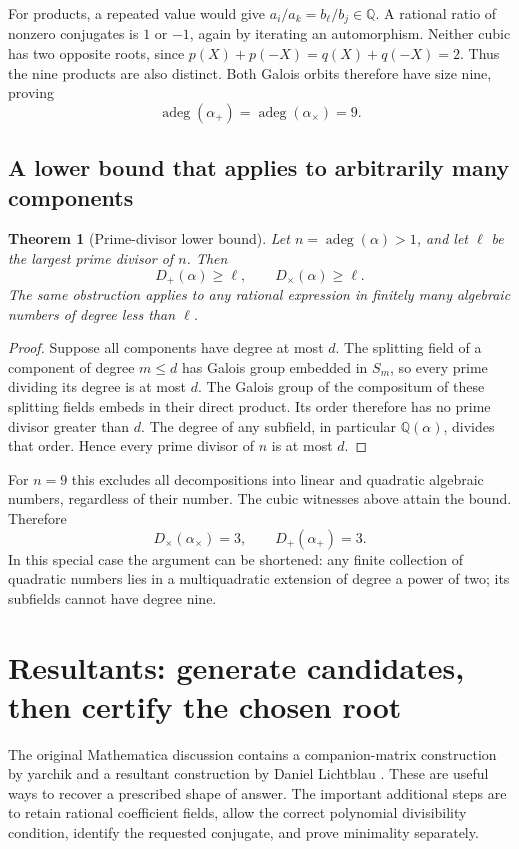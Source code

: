 \documentclass[11pt]{article}
\newcommand{\Q}{\mathbb Q}
\newcommand{\adeg}{\operatorname{adeg}}
\newtheorem{theorem}{Theorem}[section]
\theoremstyle{definition}\newtheorem{definition}[theorem]{Definition}
\theoremstyle{remark}\newtheorem{remark}[theorem]{Remark}
\begin{document}
For products, a repeated value would give $a_i/a_k=b_\ell/b_j\in\Q$.
A rational ratio of nonzero conjugates is $1$ or $-1$, again by iterating an
automorphism. Neither cubic has two opposite roots, since
$p(X)+p(-X)=q(X)+q(-X)=2$. Thus the nine products are also distinct.
Both Galois orbits therefore have size nine, proving
\[
 \adeg(\alpha_+)=\adeg(\alpha_\times)=9.
\]

\subsection{A lower bound that applies to arbitrarily many components}
\begin{theorem}[Prime-divisor lower bound]\label{thm:prime}
Let $n=\adeg(\alpha)>1$, and let $\ell$ be the largest prime divisor of $n$.
Then
\[
 D_+(\alpha)\ge\ell,\qquad D_\times(\alpha)\ge\ell.
\]
The same obstruction applies to any rational expression in finitely many
algebraic numbers of degree less than $\ell$.
\end{theorem}
\begin{proof}
Suppose all components have degree at most $d$. The splitting field of a
component of degree $m\le d$ has Galois group embedded in $S_m$, so every
prime dividing its degree is at most $d$. The Galois group of the compositum
of these splitting fields embeds in their direct product. Its order therefore
has no prime divisor greater than $d$. The degree of any subfield, in particular
$\Q(\alpha)$, divides that order. Hence every prime divisor of $n$ is at most $d$.
\end{proof}
For $n=9$ this excludes all decompositions into linear and quadratic algebraic
numbers, regardless of their number. The cubic witnesses above attain the
bound. Therefore
\[
 \boxed{D_\times(\alpha_\times)=3,\qquad D_+(\alpha_+)=3.}
\]
In this special case the argument can be shortened: any finite collection of
quadratic numbers lies in a multiquadratic extension of degree a power of two;
its subfields cannot have degree nine.

\section{Resultants: generate candidates, then certify the chosen root}

The original Mathematica discussion contains a companion-matrix construction
by yarchik and a resultant construction by Daniel Lichtblau \cite{mse}.
These are useful ways to recover a prescribed shape of answer. The important
additional steps are to retain rational coefficient fields, allow the correct
polynomial divisibility condition, identify the requested conjugate, and prove
minimality separately.
\end{document}
